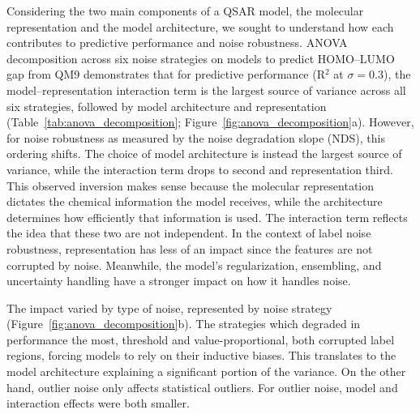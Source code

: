 \documentclass[pdflatex,sn-basic]{sn-jnl}%
\theoremstyle{thmstyleone}%
\theoremstyle{thmstyletwo}%
\theoremstyle{thmstylethree}%
\begin{document}
Considering the two main components of a QSAR model, the molecular representation and the model architecture, we sought to understand how each contributes to predictive performance and noise robustness. ANOVA decomposition across six noise strategies on models to predict HOMO--LUMO gap from QM9 demonstrates that for predictive performance (R$^2$ at $\sigma = 0.3$), the model--representation interaction term is the  largest source of variance across all six strategies, followed by model architecture and representation (Table~\ref{tab:anova_decomposition}; Figure~\ref{fig:anova_decomposition}a). However, for noise robustness as measured by the noise degradation slope (NDS), this ordering shifts. The choice of model architecture is instead the largest source of variance, while the interaction term drops to second and representation third. This observed inversion makes sense because the molecular representation dictates the chemical information the model receives, while the architecture determines how efficiently that information is used. The interaction term reflects the idea that these two are not independent. In the context of label noise robustness, representation has less of an impact since the features are not corrupted by noise. Meanwhile, the model's regularization, ensembling, and uncertainty handling have a stronger impact on how it handles noise. 

The impact varied by type of noise, represented by noise strategy (Figure~\ref{fig:anova_decomposition}b). The strategies which degraded in performance the most, threshold and value-proportional, both corrupted label regions, forcing models to rely on their inductive biases. This translates to the model architecture explaining a significant portion of the variance. On the other hand, outlier noise only affects statistical outliers. For outlier noise, model and interaction effects were both smaller.
\end{document}
